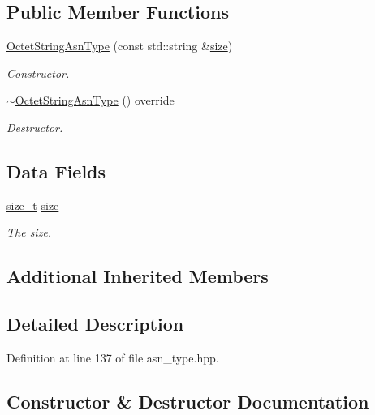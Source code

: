 \subsection*{Public Member Functions}
\begin{DoxyCompactItemize}
\item 
\hyperlink{classOctetStringAsnType_ab3f5b12f082342c386db27fdc30f9325}{Octet\+String\+Asn\+Type} (const std\+::string \&\hyperlink{classOctetStringAsnType_a854cbefd2a15457fc837377dacc59194}{size})
\begin{DoxyCompactList}\small\item\em Constructor. \end{DoxyCompactList}\item 
\hyperlink{classOctetStringAsnType_a48c66e843c1be6a0ad03e4d558e4381d}{$\sim$\+Octet\+String\+Asn\+Type} () override
\begin{DoxyCompactList}\small\item\em Destructor. \end{DoxyCompactList}\end{DoxyCompactItemize}
\subsection*{Data Fields}
\begin{DoxyCompactItemize}
\item 
\hyperlink{tutorial__fpt__2017_2intro_2sixth_2test_8c_a7c94ea6f8948649f8d181ae55911eeaf}{size\+\_\+t} \hyperlink{classOctetStringAsnType_a854cbefd2a15457fc837377dacc59194}{size}
\begin{DoxyCompactList}\small\item\em The size. \end{DoxyCompactList}\end{DoxyCompactItemize}
\subsection*{Additional Inherited Members}


\subsection{Detailed Description}


Definition at line 137 of file asn\+\_\+type.\+hpp.



\subsection{Constructor \& Destructor Documentation}
\mbox{\label{classOctetStringAsnType_ab3f5b12f082342c386db27fdc30f9325}} 
